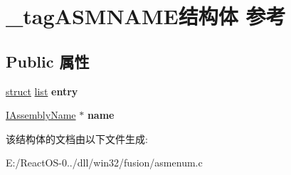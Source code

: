 \hypertarget{struct__tag_a_s_m_n_a_m_e}{}\section{\+\_\+tag\+A\+S\+M\+N\+A\+M\+E结构体 参考}
\label{struct__tag_a_s_m_n_a_m_e}
\subsection*{Public 属性}
\begin{DoxyCompactItemize}
\item 
\mbox{\label{struct__tag_a_s_m_n_a_m_e_a0d6a2aeb203b8c001484fd7c8e7b3ce9}} 
\hyperlink{interfacestruct}{struct} \hyperlink{classlist}{list} {\bfseries entry}
\item 
\mbox{\label{struct__tag_a_s_m_n_a_m_e_a3958020cabcd0aa659be00bef6219a1f}} 
\hyperlink{interface_i_assembly_name}{I\+Assembly\+Name} $\ast$ {\bfseries name}
\end{DoxyCompactItemize}


该结构体的文档由以下文件生成\+:\begin{DoxyCompactItemize}
\item 
E\+:/\+React\+O\+S-\/0../dll/win32/fusion/asmenum.\+c\end{DoxyCompactItemize}
